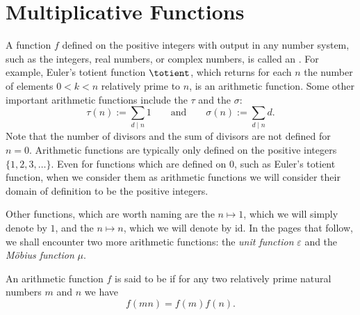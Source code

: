 
\section{Multiplicative Functions}

A function $f$ defined on the positive integers with output in any number system, such as the integers, real numbers, or complex numbers, is called an . For example, Euler's totient function $\totient$, which returns for each $n$ the number of elements $0<k<n$ relatively prime to $n$, is an arithmetic function. Some other important arithmetic functions include the  $\tau$ and the  $\sigma$:
\begin{equation*}
  \tau(n) := \sum_{d\mid n}1\qquad\text{and}\qquad \sigma(n) := \sum_{d\mid n}d.
\end{equation*}
Note that the number of divisors and the sum of divisors are not defined for $n=0$. Arithmetic functions are typically only defined on the positive integers $\{1,2,3,\ldots\}$. Even for functions which are defined on $0$, such as Euler's totient function, when we consider them as arithmetic functions we will consider their domain of definition to be the positive integers.

Other functions, which are worth naming are the  $n\mapsto 1$, which we will simply denote by $1$, and the  $n\mapsto n$, which we will denote by $\mathrm{id}$. In the pages that follow, we shall encounter two more arithmetic functions: the \emph{unit function} $\varepsilon$ and the \emph{M\"obius function} $\mu$.

\begin{definition}
  An arithmetic function $f$ is said to be  if for any two relatively prime natural numbers $m$ and $n$ we have
  \begin{equation*}
    f(mn)=f(m)f(n).
  \end{equation*}
\end{definition}

